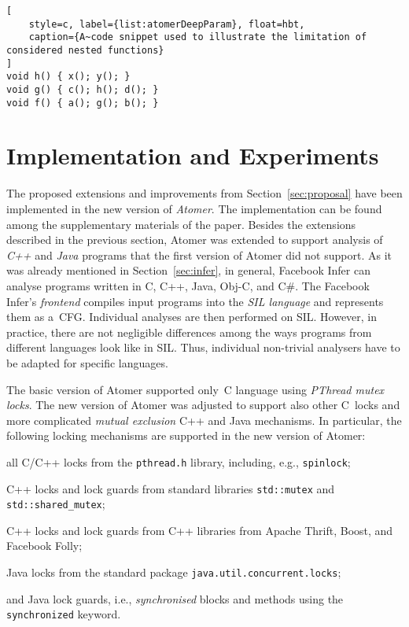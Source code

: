 \documentclass{ExcelAtFIT}
\theoremstyle{example}
\begin{document}
\begin{lstlisting}[
    style=c, label={list:atomerDeepParam}, float=hbt,
    caption={A~code snippet used to illustrate the limitation of considered nested functions}
]
void h() { x(); y(); }
void g() { c(); h(); d(); }
void f() { a(); g(); b(); }
\end{lstlisting}


\section{Implementation and Experiments}
\label{sec:exp}

The proposed extensions and improvements from Section~\ref{sec:proposal} have been implemented in the new version of \emph{Atomer}. The implementation can be found among the supplementary materials of the paper. Besides the extensions described in the previous section, Atomer was extended to support analysis of \emph{C++} and \emph{Java} programs that the first version of Atomer did not support. As it was already mentioned in Section~\ref{sec:infer}, in general, Facebook Infer can analyse programs written in C, C++, Java, Obj-C, and C\#. The Facebook Infer's \emph{frontend} compiles input programs into the \emph{SIL language} and represents them as a~CFG. Individual analyses are then performed on SIL. However, in practice, there are not negligible differences among the ways programs from different languages look like in SIL. Thus, individual non-trivial analysers have to be adapted for specific languages.

The basic version of Atomer supported only~C language using \emph{PThread mutex locks}. The new version of Atomer was adjusted to support also other C~locks and more complicated \emph{mutual exclusion} C++ and Java mechanisms. In particular, the following locking mechanisms are supported in the new version of Atomer:
\begin{enuminline}
    \item all C/C++ locks from the \texttt{pthread.h} library, including, e.g., \texttt{spinlock};

    \item C++ locks and lock guards from standard libraries \texttt{std::mutex} and \texttt{std::shared\_mutex};

    \item C++ locks and lock guards from C++ libraries from Apache Thrift, Boost, and Facebook Folly;

    \item Java locks from the standard package \texttt{java.util.concurrent.locks};

    \item and Java lock guards, i.e., \emph{synchronised} blocks and methods using the \texttt{synchronized} keyword.
\end{enuminline}
\end{document}
